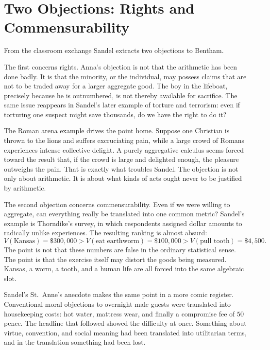 \section{Two Objections: Rights and Commensurability}

From the classroom exchange Sandel extracts two objections to Bentham.

The first concerns rights. Anna's objection is not that the arithmetic has been done badly. It is that the minority, or the individual, may possess claims that are not to be traded away for a larger aggregate good. The boy in the lifeboat, precisely because he is outnumbered, is not thereby available for sacrifice. The same issue reappears in Sandel's later example of torture and terrorism: even if torturing one suspect might save thousands, do we have the right to do it?

The Roman arena example drives the point home. Suppose one Christian is thrown to the lions and suffers excruciating pain, while a large crowd of Romans experiences intense collective delight. A purely aggregative calculus seems forced toward the result that, if the crowd is large and delighted enough, the pleasure outweighs the pain. That is exactly what troubles Sandel. The objection is not only about arithmetic. It is about what kinds of acts ought never to be justified by arithmetic.

The second objection concerns commensurability. Even if we were willing to aggregate, can everything really be translated into one common metric? Sandel's example is Thorndike's survey, in which respondents assigned dollar amounts to radically unlike experiences. The resulting ranking is almost absurd:
\begin{equation}
V(\text{Kansas})=\$300{,}000
>
V(\text{eat earthworm})=\$100{,}000
>
V(\text{pull tooth})=\$4{,}500.
\end{equation}
The point is not that these numbers are false in the ordinary statistical sense. The point is that the exercise itself may distort the goods being measured. Kansas, a worm, a tooth, and a human life are all forced into the same algebraic slot.

Sandel's St.\ Anne's anecdote makes the same point in a more comic register. Conventional moral objections to overnight male guests were translated into housekeeping costs: hot water, mattress wear, and finally a compromise fee of \(50\) pence. The headline that followed showed the difficulty at once. Something about virtue, convention, and social meaning had been translated into utilitarian terms, and in the translation something had been lost.

